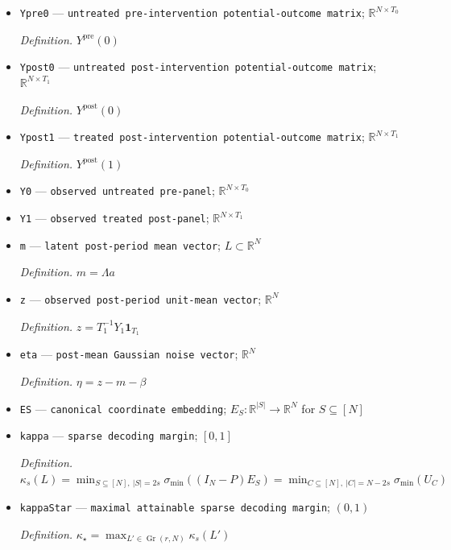 \documentclass{article}
\begin{document}
\begin{itemize}
  \item \texttt{Ypre0} --- \texttt{untreated pre-\allowbreak{}intervention potential-\allowbreak{}outcome matrix}; \(\mathbb R^{N\times T_0}\)
  \par\smallskip\noindent\emph{Definition.} \(Y^{\mathrm{pre}}(0)\)
  \item \texttt{Ypost0} --- \texttt{untreated post-\allowbreak{}intervention potential-\allowbreak{}outcome matrix}; \(\mathbb R^{N\times T_1}\)
  \par\smallskip\noindent\emph{Definition.} \(Y^{\mathrm{post}}(0)\)
  \item \texttt{Ypost1} --- \texttt{treated post-\allowbreak{}intervention potential-\allowbreak{}outcome matrix}; \(\mathbb R^{N\times T_1}\)
  \par\smallskip\noindent\emph{Definition.} \(Y^{\mathrm{post}}(1)\)
  \item \texttt{Y0} --- \texttt{observed untreated pre-\allowbreak{}panel}; \(\mathbb R^{N\times T_0}\)
  \item \texttt{Y1} --- \texttt{observed treated post-\allowbreak{}panel}; \(\mathbb R^{N\times T_1}\)
  \item \texttt{m} --- \texttt{latent post-\allowbreak{}period mean vector}; \(L\subset\mathbb R^N\)
  \par\smallskip\noindent\emph{Definition.} \(m=\Lambda a\)
  \item \texttt{z} --- \texttt{observed post-\allowbreak{}period unit-\allowbreak{}mean vector}; \(\mathbb R^N\)
  \par\smallskip\noindent\emph{Definition.} \(z=T_1^{-1}Y_1\mathbf 1_{T_1}\)
  \item \texttt{eta} --- \texttt{post-\allowbreak{}mean Gaussian noise vector}; \(\mathbb R^N\)
  \par\smallskip\noindent\emph{Definition.} \(\eta=z-m-\beta\)
  \item \texttt{ES} --- \texttt{canonical coordinate embedding}; \(E_S:\mathbb R^{|S|}\to\mathbb R^N\) for \(S\subseteq[N]\)
  \item \texttt{kappa} --- \texttt{sparse decoding margin}; \([0,1]\)
  \par\smallskip\noindent\emph{Definition.} \(\kappa_s(L)=\min_{S\subseteq[N],\ |S|=2s}\sigma_{\min}((I_N-P)E_S)=\min_{C\subseteq[N],\ |C|=N-2s}\sigma_{\min}(U_C)\)
  \item \texttt{kappaStar} --- \texttt{maximal attainable sparse decoding margin}; \((0,1)\)
  \par\smallskip\noindent\emph{Definition.} \(\kappa_\star=\max_{L'\in\operatorname{Gr}(r,N)}\kappa_s(L')\)

\end{itemize}
\end{document}
